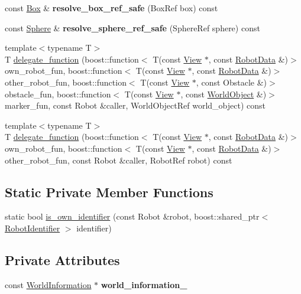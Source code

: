 \begin{CompactItemize}
\item 
\hypertarget{class_view_b641c6d8d9595721f0d43931da47c2d2}{
const \hyperlink{class_box}{Box} \& \textbf{resolve\_\-box\_\-ref\_\-safe} (BoxRef box) const }
\label{class_view_b641c6d8d9595721f0d43931da47c2d2}

\item 
\hypertarget{class_view_66c7a54d9f85ced79c33f3b17f34f4bf}{
const \hyperlink{class_sphere}{Sphere} \& \textbf{resolve\_\-sphere\_\-ref\_\-safe} (SphereRef sphere) const }
\label{class_view_66c7a54d9f85ced79c33f3b17f34f4bf}

\item 
{\footnotesize template$<$typename T$>$ }\\T \hyperlink{class_view_7eccca274db6bd4da79a294e463de06c}{delegate\_\-function} (boost::function$<$ T(const \hyperlink{class_view}{View} $\ast$, const \hyperlink{class_robot_data}{RobotData} \&)$>$ own\_\-robot\_\-fun, boost::function$<$ T(const \hyperlink{class_view}{View} $\ast$, const \hyperlink{class_robot_data}{RobotData} \&)$>$ other\_\-robot\_\-fun, boost::function$<$ T(const \hyperlink{class_view}{View} $\ast$, const Obstacle \&)$>$ obstacle\_\-fun, boost::function$<$ T(const \hyperlink{class_view}{View} $\ast$, const \hyperlink{class_world_object}{WorldObject} \&)$>$ marker\_\-fun, const Robot \&caller, WorldObjectRef world\_\-object) const 
\item 
{\footnotesize template$<$typename T$>$ }\\T \hyperlink{class_view_9fce14f4a6491176e28f19d41669a136}{delegate\_\-function} (boost::function$<$ T(const \hyperlink{class_view}{View} $\ast$, const \hyperlink{class_robot_data}{RobotData} \&)$>$ own\_\-robot\_\-fun, boost::function$<$ T(const \hyperlink{class_view}{View} $\ast$, const \hyperlink{class_robot_data}{RobotData} \&)$>$ other\_\-robot\_\-fun, const Robot \&caller, RobotRef robot) const 
\end{CompactItemize}
\subsection*{Static Private Member Functions}
\begin{CompactItemize}
\item 
static bool \hyperlink{class_view_72674a687dbcec3e4a58191a65fd1ace}{is\_\-own\_\-identifier} (const Robot \&robot, boost::shared\_\-ptr$<$ \hyperlink{class_robot_identifier}{RobotIdentifier} $>$ identifier)
\end{CompactItemize}
\subsection*{Private Attributes}
\begin{CompactItemize}
\item 
\hypertarget{class_view_cab113a8a94e62a8dc1ed7b09d98bed3}{
const \hyperlink{class_world_information}{WorldInformation} $\ast$ \textbf{world\_\-information\_\-}}
\label{class_view_cab113a8a94e62a8dc1ed7b09d98bed3}

\end{CompactItemize}


